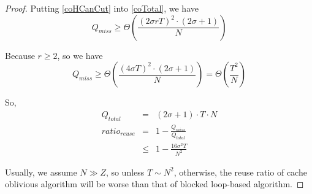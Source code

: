 \begin{proof}
Putting \eqref{coHCanCut} into \eqref{coTotal}, we have
\begin{equation}
Q_{miss} \geq \Theta (\frac{(2 \sigma r T)^2 \cdot (2 \sigma + 1)}{N})
\end{equation}

Because $r \geq 2$, so we have
\begin{equation}
Q_{miss} \geq \Theta (\frac{(4 \sigma T)^2 \cdot (2 \sigma + 1)}{N}) = \Theta (\frac{T^2}{N})
\end{equation}

So,
\begin{eqnarray}
Q_{total} & = & (2 \sigma + 1) \cdot T \cdot N \\
ratio_{reuse} & = & 1 - \frac{Q_{miss}}{Q_{total}} \\
			  & \leq & 1 - \frac{16 \sigma^2 T}{N^2}
\end{eqnarray}

Usually, we assume $N \gg Z$, so unless $T \sim N^2$, otherwise, the reuse ratio of cache oblivious algorithm
will be worse than that of blocked loop-based algorithm.
\end{proof}

